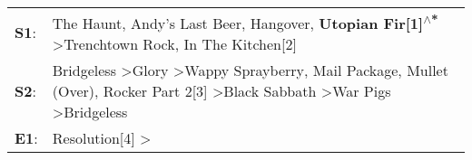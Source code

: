 \begin{supertabular}{p{0.03\textwidth}p{0.92\textwidth}}
 \textbf{S1}:  &                                                                                                                                               The Haunt\textsuperscript{}, \enspace Andy's Last Beer\textsuperscript{}, \enspace Hangover\textsuperscript{}, \enspace \textbf{Utopian Fir[1]\textsuperscript{$\wedge$*}} \textgreater \enspace Trenchtown Rock\textsuperscript{}, \enspace In The Kitchen[2]\textsuperscript{}  \enspace  \\
 \textbf{S2}:  &  Bridgeless\textsuperscript{} \textgreater \enspace Glory\textsuperscript{} \textgreater \enspace Wappy Sprayberry\textsuperscript{}, \enspace Mail Package\textsuperscript{}, \enspace Mullet (Over)\textsuperscript{}, \enspace Rocker Part 2[3]\textsuperscript{} \textgreater \enspace Black Sabbath\textsuperscript{} \textgreater \enspace War Pigs\textsuperscript{} \textgreater \enspace Bridgeless\textsuperscript{}  \enspace  \\
 \textbf{E1}:  &                                                                                                                                                                                                                                                                                                                                                   Resolution[4]\textsuperscript{} \textgreater {}\textsuperscript{}  \enspace  \\
\end{supertabular}
